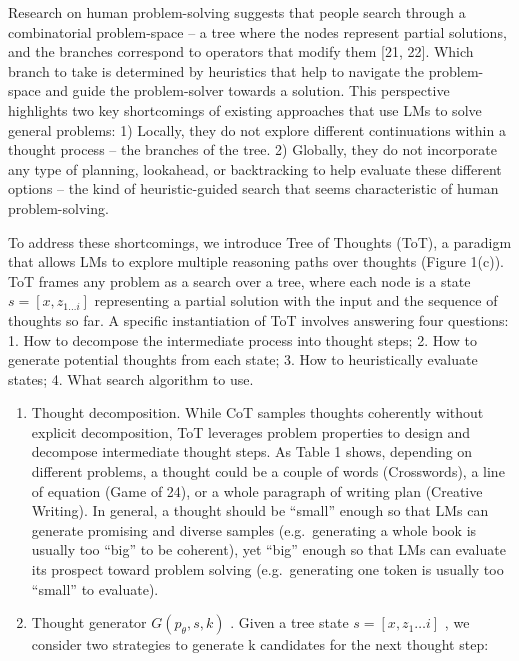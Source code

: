 \documentclass[
]{article}
\begin{document}
Research on human problem-solving suggests that people search through a
combinatorial problem-space -- a tree where the nodes represent partial
solutions, and the branches correspond to operators that modify them
{[}21, 22{]}. Which branch to take is determined by heuristics that help
to navigate the problem-space and guide the problem-solver towards a
solution. This perspective highlights two key shortcomings of existing
approaches that use LMs to solve general problems: 1) Locally, they do
not explore different continuations within a thought process -- the
branches of the tree. 2) Globally, they do not incorporate any type of
planning, lookahead, or backtracking to help evaluate these different
options -- the kind of heuristic-guided search that seems characteristic
of human problem-solving.

To address these shortcomings, we introduce Tree of Thoughts (ToT), a
paradigm that allows LMs to explore multiple reasoning paths over
thoughts (Figure 1(c)). ToT frames any problem as a search over a tree,
where each node is a state \(s = [x, z_{1\dots i}]\) representing a
partial solution with the input and the sequence of thoughts so far. A
specific instantiation of ToT involves answering four questions: 1. How
to decompose the intermediate process into thought steps; 2. How to
generate potential thoughts from each state; 3. How to heuristically
evaluate states; 4. What search algorithm to use.

\begin{enumerate}
\def\labelenumi{\arabic{enumi}.}
\item
  Thought decomposition. While CoT samples thoughts coherently without
  explicit decomposition, ToT leverages problem properties to design and
  decompose intermediate thought steps. As Table 1 shows, depending on
  different problems, a thought could be a couple of words (Crosswords),
  a line of equation (Game of 24), or a whole paragraph of writing plan
  (Creative Writing). In general, a thought should be ``small'' enough
  so that LMs can generate promising and diverse samples
  (e.g.~generating a whole book is usually too ``big'' to be coherent),
  yet ``big'' enough so that LMs can evaluate its prospect toward
  problem solving (e.g.~generating one token is usually too ``small'' to
  evaluate).
\item
  Thought generator \(G(p_{\theta}, s, k)\) . Given a tree state
  \(s = [x, z_{1} \ldots i]\) , we consider two strategies to generate k
  candidates for the next thought step:
\end{enumerate}
\end{document}
